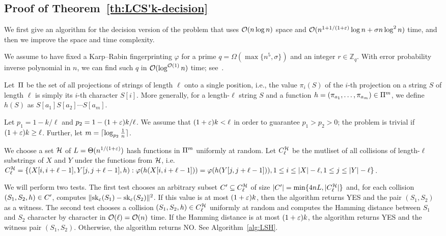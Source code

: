 \subsection{Proof of Theorem~\ref{th:LCS'k-decision}}\label{lcs:sec:decision}
We first give an algorithm for the decision version of the \kApproxLCS problem that uses $\mathcal{O}(n \log n)$ space and $\mathcal{O}(n^{1+1/(1+\varepsilon)} \log n + \sigma n \log^2 n)$ time, and then we improve the space and time complexity. 

We assume to have fixed a Karp--Rabin fingerprinting $\varphi$ for a prime $q = \Omega(\max\{n^5, \sigma\})$ and an integer $r \in \mathbb{Z}_q$. With error probability inverse polynomial in $n$, we can find such $q$ in $\mathcal{O}(\log^{\mathcal{O}(1)}n)$ time;
see~\cite{DBLP:journals/moc/TaoCH12,agrawal2004primes}. 

Let~$\Pi$ be the set of all projections of strings of length $\ell$ onto a single position, i.e., the value $\pi_i(S)$ of the $i$-th projection on a string $S$ of length $\ell$ is simply its $i$-th character $S[i]$. More generally, for a length-$\ell$ string $S$ and a function $h=(\pi_{a_1},\ldots,\pi_{a_m}) \in \Pi^m$, we define $h(S)$ as $S[a_{1}] S[a_{2}] \cdots S[a_{m}]$.

Let $p_1 = 1 - k / \ell$ and $p_2 = 1 - (1+\varepsilon) k / \ell$. We assume that $(1+\varepsilon) k< \ell$ in order to guarantee $p_1>p_2>0$; the problem is trivial if $(1+\varepsilon)k \ge \ell$. 
Further, let $m = \lceil \log_{p_2}{\tfrac{1}{n}} \rceil$.

We choose a set $\mathcal{H}$ of $L = \Theta(n^{1/(1+\varepsilon)})$ hash functions in $\Pi^m$ uniformly at random. Let $C^{\mathcal{H}}_{\ell}$ be the mutliset of all collisions of length-$\ell$ substrings of $X$ and $Y$ under the functions from $\mathcal{H}$, i.e. $C^{\mathcal{H}}_{\ell} = \{(X[i,i+\ell-1], Y[j,j+\ell-1],h) : \varphi(h(X[i,i+\ell-1])) = \varphi(h(Y[j,j+\ell-1])), 1 \le i \le |X|-\ell, 1 \le j \le |Y|-\ell\}$. 

We will perform two tests. The first test chooses an arbitrary subset $C'\subseteq C^{\mathcal{H}}_{\ell}$ of size $|C'|=\min\{4nL, |C^{\mathcal{H}}_{\ell}|\}$ and, for each collision $(S_1, S_2, h)\in C'$, computes $\lVert\mathrm{sk}_\varepsilon(S_1) - \mathrm{sk}_\varepsilon (S_2)\rVert^2$. If this value is at most $(1+\varepsilon) k$, then the algorithm returns YES and the pair $(S_1, S_2)$ as a witness. The second test chooses a collision $(S_1, S_2, h) \in C^{\mathcal{H}}_{\ell}$ uniformly at random and computes the Hamming distance between $S_1$ and $S_2$ character by character in $\mathcal{O}(\ell) = \mathcal{O}(n)$ time. If the Hamming distance is at most $(1+\varepsilon)k$, the algorithm returns YES and the witness pair $(S_1, S_2)$. Otherwise, the algorithm returns NO. See Algorithm~\ref{alg:LSH}.

